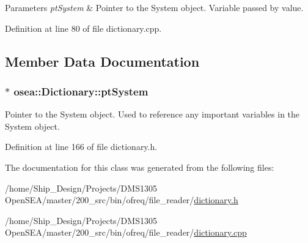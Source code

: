 \begin{DoxyParams}{Parameters}
{\em pt\-System} & Pointer to the System object. Variable passed by value. \\
\hline
\end{DoxyParams}


Definition at line 80 of file dictionary.\-cpp.



\subsection{Member Data Documentation}
\hypertarget{classosea_1_1_dictionary_a72bf4127a7ee1fb2b784abb6df020fed}{
\subsubsection[{pt\-System}]{$\ast$ osea\-::\-Dictionary\-::pt\-System\hspace{0.3cm}{\ttfamily [protected]}}}\label{classosea_1_1_dictionary_a72bf4127a7ee1fb2b784abb6df020fed}


Pointer to the System object. Used to reference any important variables in the System object. 



Definition at line 166 of file dictionary.\-h.



The documentation for this class was generated from the following files\-:\begin{DoxyCompactItemize}
\item 
/home/\-Ship\-\_\-\-Design/\-Projects/\-D\-M\-S1305 Open\-S\-E\-A/master/200\-\_\-src/bin/ofreq/file\-\_\-reader/\hyperlink{dictionary_8h}{dictionary.\-h}\item 
/home/\-Ship\-\_\-\-Design/\-Projects/\-D\-M\-S1305 Open\-S\-E\-A/master/200\-\_\-src/bin/ofreq/file\-\_\-reader/\hyperlink{dictionary_8cpp}{dictionary.\-cpp}\end{DoxyCompactItemize}

